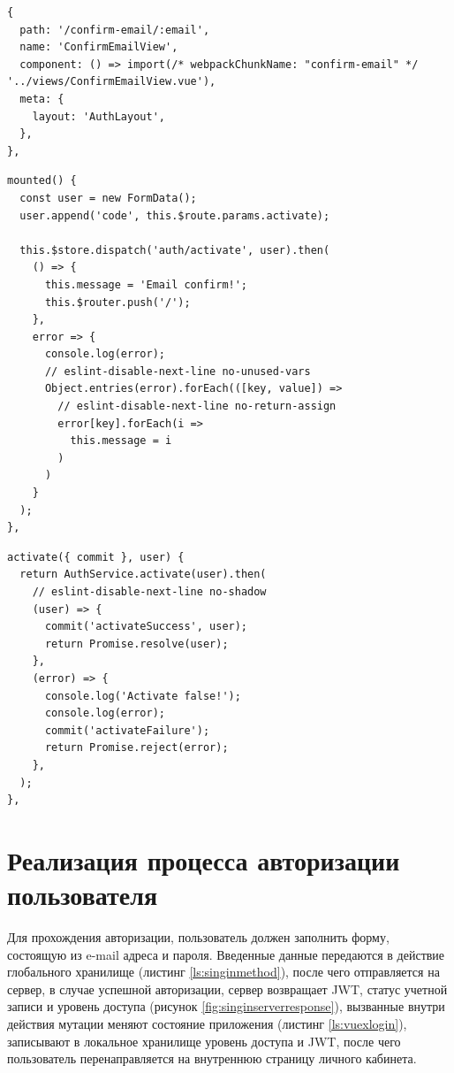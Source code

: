 \begin{lstlisting}[caption={Маршрут активации учетной записи}, label={ls:activateroute}]
{
  path: '/confirm-email/:email', 
  name: 'ConfirmEmailView',
  component: () => import(/* webpackChunkName: "confirm-email" */ '../views/ConfirmEmailView.vue'),
  meta: {
    layout: 'AuthLayout',
  },
},
\end{lstlisting}

\begin{lstlisting}[caption={Реализация компонента активации учетной записи}, label={ls:activatecomponent}]
mounted() {
  const user = new FormData();
  user.append('code', this.$route.params.activate);

  this.$store.dispatch('auth/activate', user).then(
    () => {
      this.message = 'Email confirm!';
      this.$router.push('/');
    },
    error => {
      console.log(error);
      // eslint-disable-next-line no-unused-vars
      Object.entries(error).forEach(([key, value]) =>
        // eslint-disable-next-line no-return-assign
        error[key].forEach(i =>
          this.message = i
        )
      )
    }
  );
},
\end{lstlisting}

\begin{lstlisting}[caption={Реализация действия в глобальном хранилище, активирующее учетную запись}, label={ls:vuexactivate}]
activate({ commit }, user) {
  return AuthService.activate(user).then(
    // eslint-disable-next-line no-shadow
    (user) => {
      commit('activateSuccess', user);
      return Promise.resolve(user);
    },
    (error) => {
      console.log('Activate false!');
      console.log(error);
      commit('activateFailure');
      return Promise.reject(error);
    },
  );
},
\end{lstlisting}

\section{Реализация процесса авторизации пользователя}

Для прохождения авторизации, пользователь должен заполнить форму, состоящую из e-mail адреса и пароля. Введенные данные передаются в действие глобального хранилище (листинг \ref{ls:singinmethod}), после чего отправляется на сервер, в случае успешной авторизации, сервер возвращает JWT, статус учетной записи и уровень доступа (рисунок \ref{fig:singinserverresponse}), вызванные внутри действия мутации меняют состояние приложения (листинг \ref{ls:vuexlogin}), записывают в локальное хранилище уровень доступа и JWT, после чего пользователь перенаправляется на внутреннюю страницу личного кабинета.

